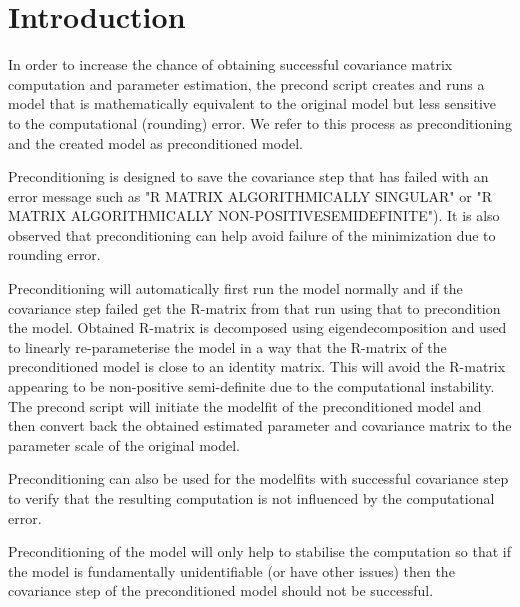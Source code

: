 
\usepackage{color}
\usepackage{amsmath}
\usepackage{tikz}
\usetikzlibrary{shapes,arrows}




\maketitle

\section{Introduction}
In order to increase the chance of obtaining successful covariance matrix computation and parameter estimation, the precond script creates and runs a model that is mathematically equivalent to the original model but less sensitive to the computational (rounding) error.  We refer to this process as preconditioning and the created model as preconditioned model.

Preconditioning is designed to save the covariance step that has failed with an error message such as "R MATRIX ALGORITHMICALLY SINGULAR" or "R MATRIX ALGORITHMICALLY NON-POSITIVESEMIDEFINITE"). It is also observed that preconditioning can help avoid failure of the minimization due to rounding error.

Preconditioning will automatically first run the model normally and if the covariance step failed get the R-matrix from that run using that to precondition the model. Obtained R-matrix is decomposed using eigendecomposition and used to linearly re-parameterise the model in a way that the R-matrix of the preconditioned model is close to an identity matrix.  This will avoid the R-matrix appearing to be non-positive semi-definite due to the computational instability.  The precond script will initiate the modelfit of the preconditioned model and then convert back the obtained estimated parameter and covariance matrix to the parameter scale of the original model.

Preconditioning can also be used for the modelfits with successful covariance step to verify that the resulting computation is not influenced by the computational error.

Preconditioning of the model will only help to stabilise the computation so that if the model is fundamentally unidentifiable (or have other issues) then the covariance step of the preconditioned model should not be successful.\\


